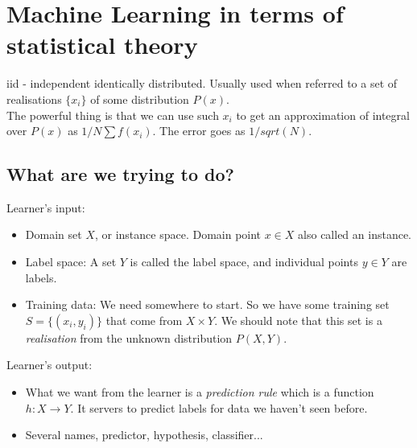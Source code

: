 \section{Machine Learning in terms of statistical theory}
\newcommand{\dB}{\dd B\mkern3mu}
\newcommand{\dA}{\dd A\mkern3mu}
iid - independent identically distributed.
Usually used when referred to a set of realisations $\lbrace x_i \rbrace$ of some distribution $P(x)$.
\\
The powerful thing is that we can use such $x_i$ to get an approximation of integral over $P(x)$ as $1/N \sum f(x_i)$.
The error goes as $1/sqrt(N)$.

\subsection{What are we trying to do?}
Learner's input:
\begin{itemize}
    \item Domain set $X$, or instance space. Domain point $x \in X$ also called an instance.
    \item Label space: A set $Y$ is called the label space, and individual points $y \in Y$ are labels.
    \item Training data: We need somewhere to start. So we have some training set $S = \lbrace (x_i,y_i) \rbrace$ that come from $X \times Y$. We should note that this set is a \emph{realisation} from the unknown distribution $P(X,Y)$.
\end{itemize}

\noindent Learner's output:
\begin{itemize}
    \item What we want from the learner is a \emph{prediction rule} which is a function $h: X\rightarrow Y$. It servers to predict labels for data we haven't seen before.
    \item Several names, predictor, hypothesis, classifier...
\end{itemize}

